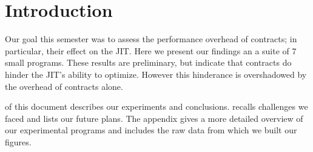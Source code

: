 \section{Introduction}
\label{intro}

Our goal this semester was to assess the performance overhead of contracts; in particular, their effect on the JIT.
Here we present our findings an a suite of 7 small programs.
These results are preliminary, but indicate that contracts do hinder the JIT's ability to optimize.
However this hinderance is overshadowed by the overhead of contracts alone.

 of this document describes our experiments and conclusions.
 recalls challenges we faced and lists our future plans.
The appendix gives a more detailed overview of our experimental programs and includes the raw data from which we built our figures.
